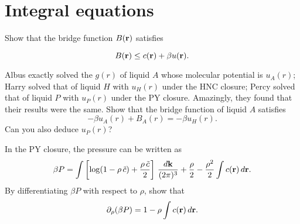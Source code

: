 \documentclass{book}
\begin{document}



\chapter{Integral equations}


Show that the bridge function $B(\boldsymbol{\mathbf{r}})$ satisfies\cite{kast2012}

\begin{equation}
  B(\boldsymbol{\mathbf{r}}) \le c(\boldsymbol{\mathbf{r}}) + \beta u(\boldsymbol{\mathbf{r}}).
\end{equation}





Albus exactly solved the $g(r)$ of liquid $A$ whose molecular potential is $u_A(r)$;
Harry solved that of liquid $H$ with $u_H(r)$ under the HNC closure;
Percy solved that of liquid $P$ with $u_P(r)$ under the PY closure.
Amazingly, they found that their results were the same.
Show that the bridge function of liquid $A$ satisfies
\begin{equation}
  -\beta u_A(r) + B_A(r) = -\beta u_H(r).
\end{equation}
Can you also deduce $u_P(r)$?




In the PY closure, the pressure can be written as\cite{baxterpressure}
\begin{align}
  \beta P =  \int \left[
    \log(1-\rho \,\tilde{c}) + \frac{ \rho \, \tilde{c} }{2}
  \right] \, \frac{ d \boldsymbol{\mathbf{k}} }{(2\pi)^3}
  +
  \frac{\rho}{2}
  - \frac{\rho^2}{2} \int c(\boldsymbol{\mathbf{r}}) \, d\boldsymbol{\mathbf{r}}.
  \label{eq:Pbaxter}
\end{align}
%
By differentiating $\beta P$ with respect to $\rho$,
show that
\begin{align}
  \partial_\rho (\beta P) = 1 - \rho \int c(\boldsymbol{\mathbf{r}}) \, d\boldsymbol{\mathbf{r}}.
\end{align}

\end{document}
